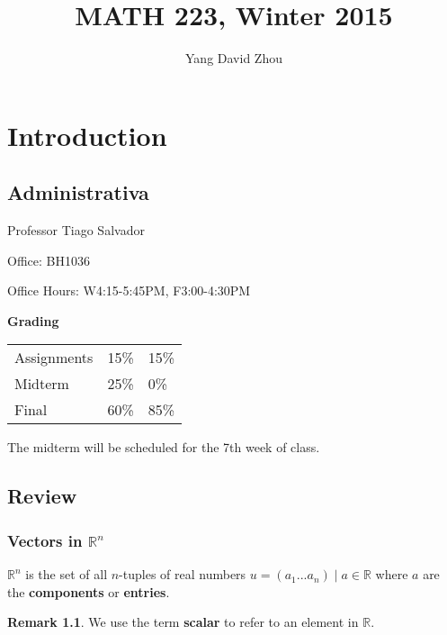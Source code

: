 \documentclass{report}
\theoremstyle{definition}
\newtheorem{_rem}{Remark}
\begin{document}
 

\title{MATH 223, Winter 2015} 

\author{Yang David Zhou}

\maketitle

\chapter{Introduction}

\section{Administrativa}

\raggedright

Professor Tiago Salvador \newline

Office: BH1036

Office Hours: W4:15-5:45PM, F3:00-4:30PM \newline

\textbf{Grading}

\begin{tabular}{ l l l }
  Assignments & 15\% & 15\% \\
  Midterm     & 25\% &  0\% \\
  Final       & 60\% & 85\% \\
\end{tabular} \newline

The midterm will be scheduled for the 7th week of class.

\section{Review}

\subsection{Vectors in \(\mathbb{R}^n\)}

\(\mathbb{R}^n\) is the set of all \(n\)-tuples of real numbers \(u=(a_1 ... a_n) \mid a\in \mathbb{R}\) where \(a\) are the \textbf{components} or \textbf{entries}.

\begin{_rem}
We use the term \textbf{scalar} to refer to an element in \(\mathbb{R}\).
\end{_rem}
\end{document}
